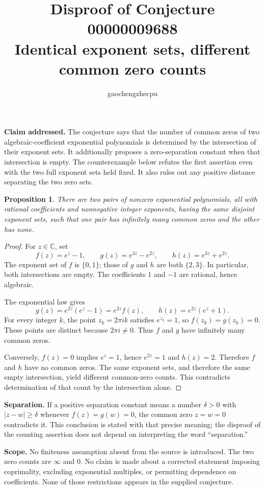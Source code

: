 \documentclass[11pt]{article}
\title{Disproof of Conjecture 00000009688\\Identical exponent sets, different common zero counts}
\author{gaochengzhecpu}
\date{}
\newtheorem{proposition}{Proposition}
\begin{document}
\maketitle
\noindent\textbf{Claim addressed.} The conjecture says that the number of common zeros of two algebraic-coefficient exponential polynomials is determined by the intersection of their exponent sets. It additionally proposes a zero-separation constant when that intersection is empty. The counterexample below refutes the first assertion even with the two full exponent sets held fixed. It also rules out any positive distance separating the two zero sets.

\begin{proposition}
There are two pairs of nonzero exponential polynomials, all with rational coefficients and nonnegative integer exponents, having the same disjoint exponent sets, such that one pair has infinitely many common zeros and the other has none.
\end{proposition}
\begin{proof}
For $z\in\mathbb C$, set
\[
 f(z)=e^z-1,\qquad
 g(z)=e^{3z}-e^{2z},\qquad
 h(z)=e^{3z}+e^{2z}.
\]
The exponent set of $f$ is $\{0,1\}$; those of $g$ and $h$ are both $\{2,3\}$. In particular, both intersections are empty. The coefficients $1$ and $-1$ are rational, hence algebraic.

The exponential law gives
\[
 g(z)=e^{2z}(e^z-1)=e^{2z}f(z),
 \qquad h(z)=e^{2z}(e^z+1).
\]
For every integer $k$, the point $z_k=2\pi i k$ satisfies $e^{z_k}=1$, so $f(z_k)=g(z_k)=0$. These points are distinct because $2\pi i\ne0$. Thus $f$ and $g$ have infinitely many common zeros.

Conversely, $f(z)=0$ implies $e^z=1$, hence $e^{2z}=1$ and $h(z)=2$. Therefore $f$ and $h$ have no common zeros. The same exponent sets, and therefore the same empty intersection, yield different common-zero counts. This contradicts determination of that count by the intersection alone.
\end{proof}

\noindent\textbf{Separation.} If a positive separation constant means a number $\delta>0$ with $|z-w|\ge\delta$ whenever $f(z)=g(w)=0$, the common zero $z=w=0$ contradicts it. This conclusion is stated with that precise meaning; the disproof of the counting assertion does not depend on interpreting the word ``separation.''

\noindent\textbf{Scope.} No finiteness assumption absent from the source is introduced. The two zero counts are $\infty$ and $0$. No claim is made about a corrected statement imposing coprimality, excluding exponential multiples, or permitting dependence on coefficients. None of those restrictions appears in the supplied conjecture.
\end{document}
